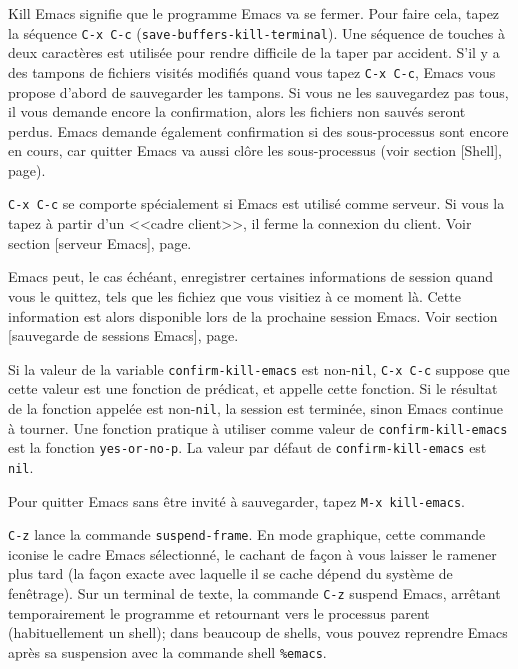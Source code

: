 Kill Emacs signifie que le programme Emacs va se fermer. Pour faire cela,
tapez la séquence \texttt{C-x C-c} (\texttt{save-buffers-kill-terminal}). Une
séquence de touches à deux caractères est utilisée pour rendre
difficile de la taper par accident. S'il y a des tampons de fichiers
visités modifiés quand vous tapez \texttt{C-x C-c}, Emacs vous propose
d'abord de sauvegarder les tampons. Si vous ne les sauvegardez pas
tous, il vous demande encore la confirmation, alors les fichiers non
sauvés seront perdus. Emacs demande également confirmation si des
sous-processus sont encore en cours, car quitter Emacs va aussi clôre
les sous-processus (voir section [Shell],
page).\par 

\texttt{C-x C-c} se comporte spécialement si Emacs est utilisé comme
serveur. Si vous la tapez à partir d'un <<cadre client>>, il ferme la
connexion du client. Voir section [serveur Emacs],
page.\par 

Emacs peut, le cas échéant, enregistrer certaines informations de
session quand vous le quittez, tels que les fichiez que vous visitiez
à ce moment là. Cette information est alors disponible lors de la
prochaine session Emacs. Voir section [sauvegarde de
sessions Emacs], page.\par 

Si la valeur de la variable \texttt{confirm-kill-emacs} est
non-\texttt{nil}, \texttt{C-x C-c} suppose que cette valeur est une
fonction de prédicat, et appelle cette fonction. Si le résultat de la
fonction appelée est non-\texttt{nil}, la session est terminée, sinon
Emacs continue à tourner. Une fonction pratique à utiliser comme
valeur de \texttt{confirm-kill-emacs} est la fonction
\texttt{yes-or-no-p}. La valeur par défaut de
\texttt{confirm-kill-emacs} est \texttt{nil}.\par 

Pour quitter Emacs sans être invité à sauvegarder, tapez \texttt{M-x
  kill-emacs}. 

\texttt{C-z} lance la commande \texttt{suspend-frame}. En mode
graphique, cette commande iconise le cadre Emacs sélectionné, le
cachant de façon à vous laisser le ramener plus tard (la façon exacte
avec laquelle il se cache dépend du système de fenêtrage). Sur un
terminal de texte, la commande \texttt{C-z} suspend Emacs, arrêtant
temporairement le programme et retournant vers le processus parent
(habituellement un shell); dans beaucoup de shells, vous pouvez
reprendre Emacs après sa suspension avec la commande shell
\texttt{\%emacs}.\par 

